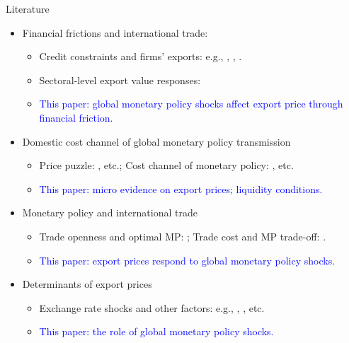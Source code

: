\documentclass[10pt]{beamer}
\begin{document}
\begin{frame}{Literature}

\begin{itemize}

    \item Financial frictions and international trade: 
    \begin{itemize}
        \item Credit constraints and firms' exports: e.g., \cite{manova2013credit}, \cite{manova2015firm}, \cite{amberg2021trade}.
        \item Sectoral-level export value responses: \cite{lin2018international}
        \item \textcolor{blue}{This paper: global monetary policy shocks affect export price through financial friction.}
    \end{itemize}

    \item Domestic cost channel of global monetary policy transmission
    \begin{itemize}
        \item Price puzzle: \cite{sims1992interpreting}, etc.; Cost channel of monetary policy:  \cite{boehl2022structural}, etc.
        \item \textcolor{blue}{This paper: micro evidence on export prices; liquidity conditions.}
    \end{itemize} 

    \item Monetary policy and international trade
    \begin{itemize}
        \item Trade openness and optimal MP: \cite{lombardo2014openness}; Trade cost and MP trade-off: \cite{cacciatore2021trade}. 
        \item \textcolor{blue}{This paper: export prices respond to global monetary policy shocks}.
    \end{itemize}
    
    \item Determinants of export prices
    \begin{itemize}
        \item Exchange rate shocks and other factors: e.g., \cite{amiti2014importers}, \cite{manova2012export}, etc.
        \item \textcolor{blue}{This paper: the role of global monetary policy shocks.}
    \end{itemize}

\end{itemize}


\end{frame}
\end{document}
